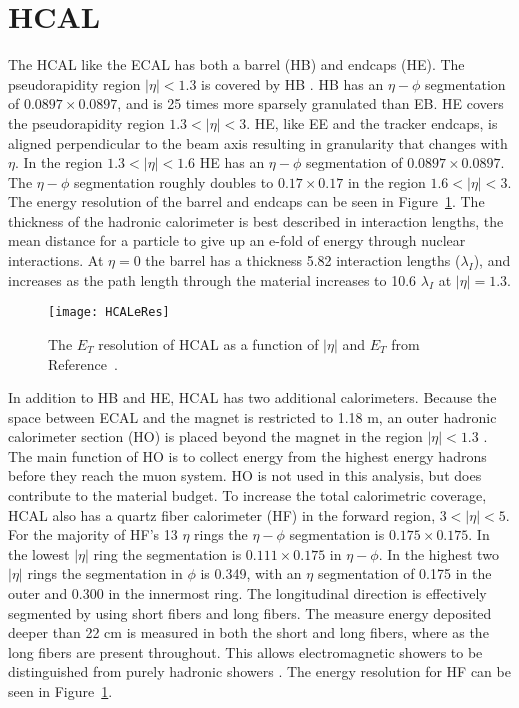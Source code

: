   \section{HCAL}
    The HCAL like the ECAL has both a barrel (HB) and endcaps (HE).
    The pseudorapidity region $|\eta|<1.3$ is covered by HB \cite{tCmsE}. 
    HB has an $\eta-\phi$ segmentation of $0.0897\times0.0897$, and is 25 times more
    	sparsely granulated than EB.
    HE covers the pseudorapidity region $1.3<|\eta|<3$.
    HE, like EE and the tracker endcaps, is aligned perpendicular to the beam axis
    	resulting in granularity that changes with $\eta$.
    In the region $1.3 <|\eta|< 1.6$ HE has an $\eta-\phi$ segmentation of 
    	$0.0897\times0.0897$.
    The $\eta-\phi$ segmentation roughly doubles to $0.17\times0.17$ in the region
    	$1.6 <|\eta|< 3$.
    The energy resolution of the barrel and endcaps can be seen in  
    	Figure~\ref{HCALeRes}.
    The thickness of the hadronic calorimeter is best described in interaction
    	lengths, the mean distance for a particle to give up an e-fold of energy
    	through nuclear interactions. 
    At $\eta = 0$ the barrel has a thickness 5.82 interaction lengths 
    	($\lambda_{I}$), and increases as the path length through the material 
    	increases to 10.6 $\lambda_{I}$ at $|\eta| = 1.3$.
    \begin{figure}[h]
      \centering
        \texttt{[image: HCALeRes]}
      \caption{The $E_{T}$ resolution of HCAL as a function of $|\eta|$ and $E_{T}$
    	from Reference~\cite{tCmsE}.}
      \label{HCALeRes}
    \end{figure}
    
    In addition to HB and HE, HCAL has two additional calorimeters.
    Because the space between ECAL and the magnet is restricted to 1.18 m, an
    	outer hadronic calorimeter section (HO) is placed beyond the magnet
    	in the region $|\eta|<1.3$ \cite{tCmsE}.
    The main function of HO is to collect energy from the highest energy hadrons
    	before they reach the muon system.
    HO is not used in this analysis, but does contribute to the material budget. 
    To increase the total calorimetric coverage, HCAL also has a quartz fiber 
    	calorimeter (HF) in the forward region, $3 < |\eta| < 5$.
    For the majority of HF's 13 $\eta$ rings the $\eta-\phi$ segmentation is 
    	$0.175\times0.175$.
    In the lowest $|\eta|$ ring the segmentation is $0.111\times0.175$ in 
    	$\eta-\phi$.
    In the highest two $|\eta|$ rings the segmentation in $\phi$ is 0.349, with an
    	$\eta$ segmentation of 0.175 in the outer and 0.300 in the innermost 
    	ring. 
    The longitudinal direction is effectively segmented by using short fibers and
    	long fibers.
    The measure energy deposited deeper than 22 cm is measured in both the short
    	and long fibers, where as the long fibers are present throughout.
    This allows electromagnetic showers to be distinguished from purely hadronic 
    	showers \cite{tCmsE}.
    The energy resolution for HF can be seen in Figure~\ref{HCALeRes}.  
    
